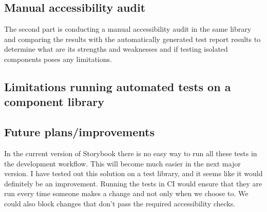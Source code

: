 \documentclass{master_thesis}
\begin{document}
\subsection{Manual accessibility audit}

The second part is conducting a manual accessibility audit in the same library and comparing the results with the automatically generated test report results to determine what are its strengths and weaknesses and if testing isolated components poses any limitations.

\subsection{Limitations running automated tests on a component library}
\subsection{Future plans/improvements}
In the current version of Storybook there is no easy way to run all these tests in the development workflow. This will become much easier in the next major version. I have tested out this solution on a test library, and it seems like it would definitely be an improvement. Running the tests in CI would ensure that they are run every time someone makes a change and not only when we choose to. We could also block changes that don't pass the required accessibility checks.
\end{document}
